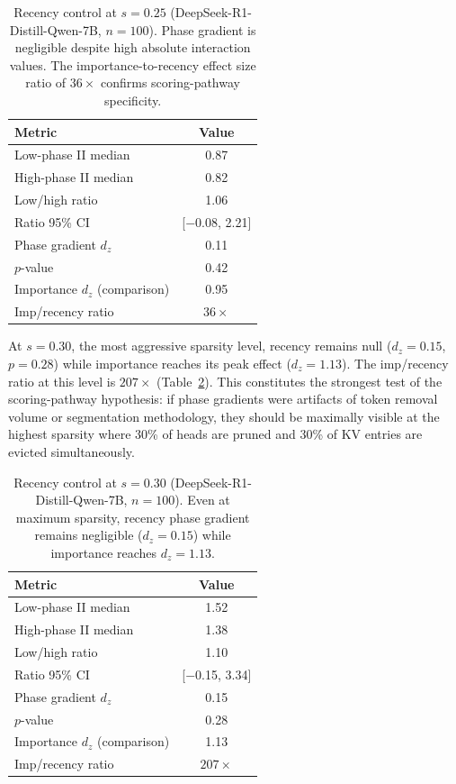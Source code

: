 \documentclass[11pt,a4paper]{article}
\begin{document}
\begin{table}[t]
\centering
\caption{Recency control at $s=0.25$ (DeepSeek-R1-Distill-Qwen-7B, $n=100$). Phase gradient is negligible despite high absolute interaction values. The importance-to-recency effect size ratio of $36\times$ confirms scoring-pathway specificity.}
\label{tab:recency_s025}
\begin{tabular}{lc}
\toprule
Metric & Value \\
\midrule
Low-phase II median & 0.87 \\
High-phase II median & 0.82 \\
Low/high ratio & 1.06 \\
Ratio 95\% CI & [$-$0.08, 2.21] \\
Phase gradient $d_z$ & 0.11 \\
$p$-value & 0.42 \\
Importance $d_z$ (comparison) & 0.95 \\
Imp/recency ratio & $36\times$ \\
\bottomrule
\end{tabular}
\end{table}

At $s=0.30$, the most aggressive sparsity level, recency remains null ($d_z = 0.15$, $p = 0.28$) while importance reaches its peak effect ($d_z = 1.13$). The imp/recency ratio at this level is $207\times$ (Table~\ref{tab:recency_s030}). This constitutes the strongest test of the scoring-pathway hypothesis: if phase gradients were artifacts of token removal volume or segmentation methodology, they should be maximally visible at the highest sparsity where 30\% of heads are pruned and 30\% of KV entries are evicted simultaneously.

\begin{table}[t]
\centering
\caption{Recency control at $s=0.30$ (DeepSeek-R1-Distill-Qwen-7B, $n=100$). Even at maximum sparsity, recency phase gradient remains negligible ($d_z = 0.15$) while importance reaches $d_z = 1.13$.}
\label{tab:recency_s030}
\begin{tabular}{lc}
\toprule
Metric & Value \\
\midrule
Low-phase II median & 1.52 \\
High-phase II median & 1.38 \\
Low/high ratio & 1.10 \\
Ratio 95\% CI & [$-$0.15, 3.34] \\
Phase gradient $d_z$ & 0.15 \\
$p$-value & 0.28 \\
Importance $d_z$ (comparison) & 1.13 \\
Imp/recency ratio & $207\times$ \\
\bottomrule
\end{tabular}
\end{table}
\end{document}
